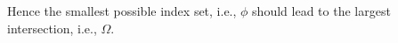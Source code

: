 \documentclass[preview]{standalone}
\begin{document}
\begin{center}
Hence the smallest possible index set, i.e., $\phi$ should lead to the largest intersection, i.e., $\Omega$.
\end{center}
\end{document}
